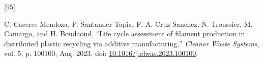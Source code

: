 \documentclass[
]{article}
\newlength{\cslhangindent}
\newlength{\csllabelwidth}
\newlength{\cslentryspacingunit} %
\newenvironment{CSLReferences}[2] %
 {%
  \setlength{\parindent}{0pt}
  \ifodd #1
  \let\oldpar\par
  \def\par{\hangindent=\cslhangindent\oldpar}
  \fi
  \setlength{\parskip}{#2\cslentryspacingunit}
 }%
 {}
\newcommand{\CSLLeftMargin}[1]{\parbox[t]{\csllabelwidth}{#1}}
\newcommand{\CSLRightInline}[1]{\parbox[t]{\linewidth - \csllabelwidth}{#1}\break}
\begin{document}
\begin{CSLReferences}{0}{0}
\leavevmode{}%
\CSLLeftMargin{{[}95{]} }%
\CSLRightInline{C. Caceres-Mendoza, P. Santander-Tapia, F. A. Cruz
Sanchez, N. Troussier, M. Camargo, and H. Boudaoud, {``Life cycle
assessment of filament production in distributed plastic recycling via
additive manufacturing,''} \emph{Cleaner Waste Systems}, vol. 5, p.
100100, Aug. 2023, doi:
\href{https://doi.org/10.1016/j.clwas.2023.100100}{10.1016/j.clwas.2023.100100}.}

\end{CSLReferences}
\end{document}
